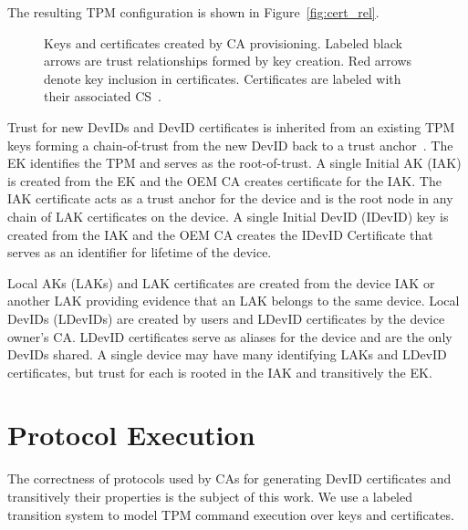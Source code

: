 \documentclass[runningheads]{llncs}
\begin{document}
\noindent The resulting TPM configuration is shown in
Figure~\ref{fig:cert_rel}.

\begin{figure}[hbtp]
  \centering
  
  \caption{Keys and certificates created by CA provisioning. Labeled
    black arrows are trust relationships formed by key creation.  Red
    arrows denote key inclusion in certificates. Certificates are
    labeled with their associated CS~\citep{DevIDSpec-TCG}.}
  \label{fig:cert-rel}
\end{figure}


Trust for new DevIDs and DevID certificates is inherited from an
existing TPM keys forming a chain-of-trust from the new DevID back to
a trust anchor~\citep{DevIDSpec-TCG}. The EK identifies the TPM and
serves as the root-of-trust.  A single Initial AK (IAK) is created
from the EK and the OEM CA creates certificate for the IAK.  The IAK
certificate acts as a trust anchor for the device and is the root node
in any chain of LAK certificates on the device.  A single Initial
DevID (IDevID) key is created from the IAK and the OEM CA creates the
IDevID Certificate that serves as an identifier for lifetime of the
device.

Local AKs (LAKs) and LAK certificates are created from the device IAK
or another LAK providing evidence that an LAK belongs to the same
device.  Local DevIDs (LDevIDs) are created by users and LDevID
certificates by the device owner's CA. LDevID certificates serve as
aliases for the device and are the only DevIDs shared.  A single
device may have many identifying LAKs and LDevID certificates, but
trust for each is rooted in the IAK and transitively the EK.

\section{Protocol Execution}

The correctness of protocols used by CAs for generating DevID
certificates and transitively their properties is the subject of this
work.  We use a labeled transition system to model TPM command
execution over keys and certificates.
\end{document}
